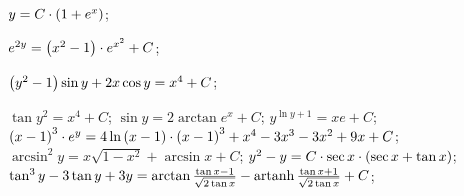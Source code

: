\begin{enumsols}
		\item \( y = C \cdot \left( 1 + e^{x} \right) \); \sfill %
		\item \( e^{2y} = \left( x^2 - 1 \right) \cdot e^{x^2} + C \); \sfill %
		\item \( \left( y^2 - 1 \right) \sin{y} + 2x \cos{y} = x^4 + C \); \sfill %
		\item \( \tan{y^2} = x^4 + C \); \sfill %
		\itemstar \( \sin{y} = 2 \arctan{e^{x}} + C \); \sfill %
		\itemstar \( y^{\ln{y} + 1} = xe + C \); \sfill %
		\itemstar \( \left( x-1 \right)^3 \cdot e^{y} = 4\ln\left( x - 1 \right) \cdot \left( x-1 \right)^3 + x^4 - 3x^3 - 3x^2 + 9x + C \); \sfill %
		\label{sol:firstorder:separable2}
		\itemstar \( \arcsin^2{y} = x \sqrt{1 - x^2} + \arcsin{x} + C \); \sfill %
		\itemstar \( y^2 - y = C \cdot \sec{x} \cdot \left( \sec{x} + \tan{x} \right) \); \sfill %
		\itemstar \( \tan^3{y} - 3\tan{y} + 3y = \arctan{\frac{\tan{x} - 1}{\sqrt{2 \tan{x}}}} - \operatorname{artanh}{\frac{\tan{x} + 1}{\sqrt{2 \tan{x}}}} + C \); \sfill %


\end{enumsols}
